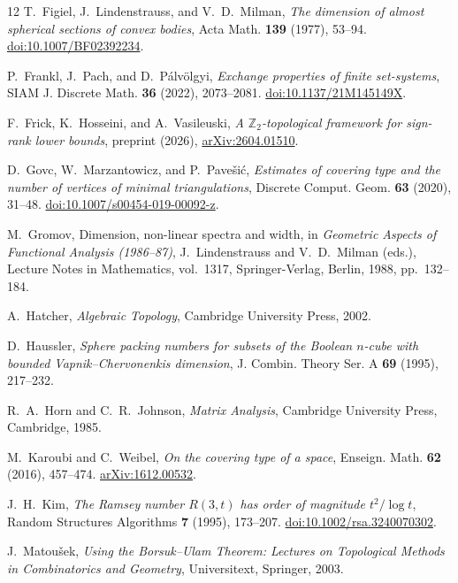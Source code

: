 \documentclass[11pt]{article}
\theoremstyle{remark}
\begin{document}
\begin{thebibliography}{12}
T.~Figiel, J.~Lindenstrauss, and V.~D.~Milman,
\emph{The dimension of almost spherical sections of convex bodies},
Acta Math. \textbf{139} (1977), 53--94.
\href{https://doi.org/10.1007/BF02392234}{doi:10.1007/BF02392234}.

P.~Frankl, J.~Pach, and D.~P\'alv\"olgyi,
\emph{Exchange properties of finite set-systems},
SIAM J. Discrete Math. \textbf{36} (2022), 2073--2081.
\href{https://doi.org/10.1137/21M145149X}{doi:10.1137/21M145149X}.

F.~Frick, K.~Hosseini, and A.~Vasileuski,
\emph{A $\mathbb Z_2$-topological framework for sign-rank lower bounds},
preprint (2026),
\href{https://arxiv.org/abs/2604.01510}{arXiv:2604.01510}.

D.~Govc, W.~Marzantowicz, and P.~Pave\v{s}i\'c,
\emph{Estimates of covering type and the number of vertices
of minimal triangulations},
Discrete Comput. Geom. \textbf{63} (2020), 31--48.
\href{https://doi.org/10.1007/s00454-019-00092-z}{doi:10.1007/s00454-019-00092-z}.

M.~Gromov,
Dimension, non-linear spectra and width,
in \emph{Geometric Aspects of Functional Analysis (1986--87)},
J.~Lindenstrauss and V.~D.~Milman (eds.),
Lecture Notes in Mathematics, vol.~1317,
Springer-Verlag, Berlin, 1988, pp.~132--184.

A.~Hatcher,
\emph{Algebraic Topology},
Cambridge University Press, 2002.

D.~Haussler,
\emph{Sphere packing numbers for subsets of the Boolean $n$-cube
with bounded Vapnik--Chervonenkis dimension},
J. Combin. Theory Ser. A \textbf{69} (1995), 217--232.

R.~A.~Horn and C.~R.~Johnson,
\emph{Matrix Analysis},
Cambridge University Press, Cambridge, 1985.

M.~Karoubi and C.~Weibel,
\emph{On the covering type of a space},
Enseign. Math. \textbf{62} (2016), 457--474.
\href{https://arxiv.org/abs/1612.00532}{arXiv:1612.00532}.

J.~H.~Kim,
\emph{The Ramsey number $R(3,t)$ has order of magnitude $t^2/\log t$},
Random Structures Algorithms \textbf{7} (1995), 173--207.
\href{https://doi.org/10.1002/rsa.3240070302}{doi:10.1002/rsa.3240070302}.

J.~Matou\v sek,
\emph{Using the Borsuk--Ulam Theorem: Lectures on Topological Methods
in Combinatorics and Geometry}, Universitext, Springer, 2003.


\end{thebibliography}
\end{document}
